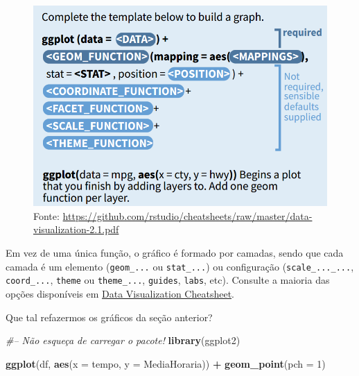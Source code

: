\documentclass[]{book}
\newenvironment{Shaded}{\begin{snugshade}}{\end{snugshade}}
\newcommand{\KeywordTok}[1]{\textcolor[rgb]{0.13,0.29,0.53}{\textbf{#1}}}
\newcommand{\DataTypeTok}[1]{\textcolor[rgb]{0.13,0.29,0.53}{#1}}
\newcommand{\DecValTok}[1]{\textcolor[rgb]{0.00,0.00,0.81}{#1}}
\newcommand{\StringTok}[1]{\textcolor[rgb]{0.31,0.60,0.02}{#1}}
\newcommand{\CommentTok}[1]{\textcolor[rgb]{0.56,0.35,0.01}{\textit{#1}}}
\newcommand{\OperatorTok}[1]{\textcolor[rgb]{0.81,0.36,0.00}{\textbf{#1}}}
\newcommand{\NormalTok}[1]{#1}
\theoremstyle{definition}
\theoremstyle{definition}
\theoremstyle{definition}
\theoremstyle{remark}
\begin{document}
\begin{figure}
\centering
\includegraphics{figuras/ggplot_guide.png}
\caption{Fonte:
\url{https://github.com/rstudio/cheatsheets/raw/master/data-visualization-2.1.pdf}}
\end{figure}

Em vez de uma única função, o gráfico é formado por camadas, sendo que
cada camada é um elemento (\texttt{geom\_...} ou \texttt{stat\_...}) ou
configuração (\texttt{scale\_...\_...}, \texttt{coord\_...},
\texttt{theme} ou \texttt{theme\_...}, \texttt{guides}, \texttt{labs},
etc). Consulte a maioria das opções disponíveis em
\href{https://github.com/rstudio/cheatsheets/raw/master/data-visualization-2.1.pdf}{Data
Visualization Cheatsheet}.

Que tal refazermos os gráficos da seção anterior?

\begin{Shaded}
\begin{Highlighting}[]
\CommentTok{#-- Não esqueça de carregar o pacote!}
\KeywordTok{library}\NormalTok{(ggplot2)}
\end{Highlighting}
\end{Shaded}

\begin{Shaded}
\begin{Highlighting}[]
\KeywordTok{ggplot}\NormalTok{(df, }\KeywordTok{aes}\NormalTok{(}\DataTypeTok{x =}\NormalTok{ tempo, }\DataTypeTok{y =}\NormalTok{ MediaHoraria)) }\OperatorTok{+}
\StringTok{  }\KeywordTok{geom_point}\NormalTok{(}\DataTypeTok{pch =} \DecValTok{1}\NormalTok{)}
\end{Highlighting}
\end{Shaded}
\end{document}
